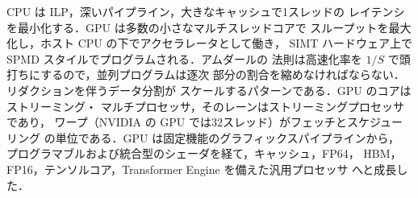 \documentclass[../main.tex]{subfiles}
\begin{document}
\begin{keypoint}[章のまとめ]
  CPU は ILP，深いパイプライン，大きなキャッシュで1スレッドの
  レイテンシを最小化する．GPU は多数の小さなマルチスレッドコアで
  スループットを最大化し，ホスト CPU の下でアクセラレータとして働き，
  SIMT ハードウェア上で SPMD スタイルでプログラムされる．アムダールの
  法則は高速化率を $1/S$ で頭打ちにするので，並列プログラムは逐次
  部分の割合を縮めなければならない．リダクションを伴うデータ分割が
  スケールするパターンである．GPU のコアはストリーミング・
  マルチプロセッサ，そのレーンはストリーミングプロセッサであり，
  ワープ（NVIDIA の GPU では32スレッド）がフェッチとスケジューリング
  の単位である．GPU は固定機能のグラフィックスパイプラインから，
  プログラマブルおよび統合型のシェーダを経て，キャッシュ，FP64，
  HBM，FP16，テンソルコア，Transformer Engine を備えた汎用プロセッサ
  へと成長した．
\end{keypoint}
\end{document}
